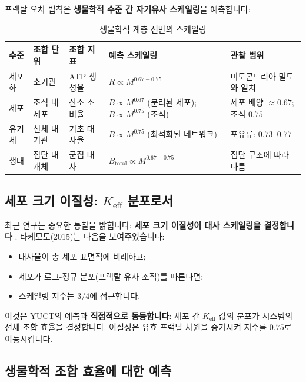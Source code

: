 \documentclass[11pt,a4paper]{article}
\newcommand{\Keff}{K_{\mathrm{eff}}}
\begin{document}
	프랙탈 오차 법칙은 \textbf{생물학적 수준 간 자기유사 스케일링}을 예측합니다:
	
	\begin{table}[htbp]
		\centering
		\caption{생물학적 계층 전반의 스케일링}
		\label{tab:hierarchical-scaling}
		\begin{tabular}{p{3cm} p{3cm} p{3.5cm} p{2.5cm} p{3cm}}
			\toprule
			\textbf{수준} & \textbf{조합 단위} & \textbf{조합 지표} & \textbf{예측 스케일링} & \textbf{관찰 범위} \\
			\midrule
			세포하 & 소기관 & ATP 생성율 & \(R \propto M^{0.67-0.75}\) & 미토콘드리아 밀도와 일치 \cite{West2002} \\
			세포 & 조직 내 세포 & 산소 소비율 & \(B \propto M^{0.67}\) (분리된 세포); \(B \propto M^{0.75}\) (조직) & 세포 배양 \(\approx 0.67\); 조직 \(0.75\) \cite{West2002} \\
			유기체 & 신체 내 기관 & 기초 대사율 & \(B \propto M^{0.75}\) (최적화된 네트워크) & 포유류: \(0.73\)–\(0.77\) \cite{Kleiber1932} \\
			생태 & 집단 내 개체 & 군집 대사 & \(B_{\text{total}} \propto M^{0.67-0.75}\) & 집단 구조에 따라 다름 \cite{Glazier2005} \\
			\bottomrule
		\end{tabular}
	\end{table}
	
	\subsection{세포 크기 이질성: \(\Keff\) 분포로서}
	
	최근 연구는 중요한 통찰을 밝힙니다: \textbf{세포 크기 이질성이 대사 스케일링을 결정합니다} \cite{Takemoto2015}. 타케모토(2015)는 다음을 보여주었습니다:
	\begin{itemize}
		\item 대사율이 총 세포 표면적에 비례하고;
		\item 세포가 로그-정규 분포(프랙탈 유사 조직)를 따른다면;
		\item 스케일링 지수는 \(3/4\)에 접근합니다.
	\end{itemize}
	이것은 YUCT의 예측과 \textbf{직접적으로 동등합니다}: 세포 간 \(\Keff\) 값의 분포가 시스템의 전체 조합 효율을 결정합니다. 이질성은 유효 프랙탈 차원을 증가시켜 지수를 \(0.75\)로 이동시킵니다.
	
	\subsection{생물학적 조합 효율에 대한 예측}
	
\end{document}
